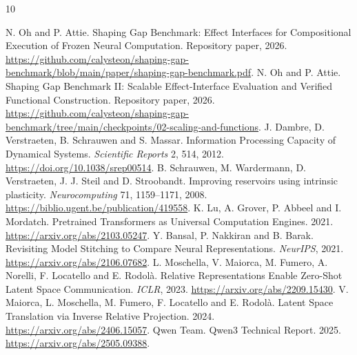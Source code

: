 \documentclass[11pt]{article}
\begin{document}
\begin{thebibliography}{10}\raggedright
{} N. Oh and P. Attie. Shaping Gap Benchmark: Effect Interfaces for Compositional Execution of Frozen Neural Computation. Repository paper, 2026. \url{https://github.com/calysteon/shaping-gap-benchmark/blob/main/paper/shaping-gap-benchmark.pdf}.
 N. Oh and P. Attie. Shaping Gap Benchmark II: Scalable Effect-Interface Evaluation and Verified Functional Construction. Repository paper, 2026. \url{https://github.com/calysteon/shaping-gap-benchmark/tree/main/checkpoints/02-scaling-and-functions}.
 J. Dambre, D. Verstraeten, B. Schrauwen and S. Massar. Information Processing Capacity of Dynamical Systems. \emph{Scientific Reports} 2, 514, 2012. \url{https://doi.org/10.1038/srep00514}.
 B. Schrauwen, M. Wardermann, D. Verstraeten, J. J. Steil and D. Stroobandt. Improving reservoirs using intrinsic plasticity. \emph{Neurocomputing} 71, 1159--1171, 2008. \url{https://biblio.ugent.be/publication/419558}.
 K. Lu, A. Grover, P. Abbeel and I. Mordatch. Pretrained Transformers as Universal Computation Engines. 2021. \url{https://arxiv.org/abs/2103.05247}.
 Y. Bansal, P. Nakkiran and B. Barak. Revisiting Model Stitching to Compare Neural Representations. \emph{NeurIPS}, 2021. \url{https://arxiv.org/abs/2106.07682}.
 L. Moschella, V. Maiorca, M. Fumero, A. Norelli, F. Locatello and E. Rodol\`a. Relative Representations Enable Zero-Shot Latent Space Communication. \emph{ICLR}, 2023. \url{https://arxiv.org/abs/2209.15430}.
 V. Maiorca, L. Moschella, M. Fumero, F. Locatello and E. Rodol\`a. Latent Space Translation via Inverse Relative Projection. 2024. \url{https://arxiv.org/abs/2406.15057}.
 Qwen Team. Qwen3 Technical Report. 2025. \url{https://arxiv.org/abs/2505.09388}.
\end{thebibliography}
\end{document}
